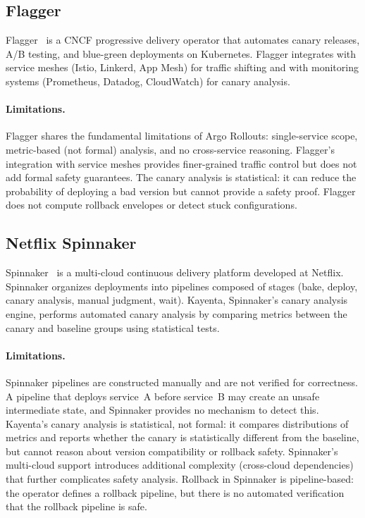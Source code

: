 \documentclass[10pt,twocolumn]{article}
\begin{document}
\subsection{Flagger}

Flagger~\cite{flagger} is a CNCF progressive delivery operator
that automates canary releases, A/B testing, and blue-green
deployments on Kubernetes. Flagger integrates with service meshes
(Istio, Linkerd, App Mesh) for traffic shifting and with
monitoring systems (Prometheus, Datadog, CloudWatch) for canary
analysis.

\paragraph{Limitations.}
Flagger shares the fundamental limitations of Argo Rollouts:
single-service scope, metric-based (not formal) analysis, and
no cross-service reasoning. Flagger's integration with service
meshes provides finer-grained traffic control but does not add
formal safety guarantees. The canary analysis is statistical:
it can reduce the probability of deploying a bad version but
cannot provide a safety proof. Flagger does not compute rollback
envelopes or detect stuck configurations.

\subsection{Netflix Spinnaker}

Spinnaker~\cite{spinnaker} is a multi-cloud continuous delivery
platform developed at Netflix. Spinnaker organizes deployments
into pipelines composed of stages (bake, deploy, canary analysis,
manual judgment, wait). Kayenta, Spinnaker's canary analysis
engine, performs automated canary analysis by comparing metrics
between the canary and baseline groups using statistical tests.

\paragraph{Limitations.}
Spinnaker pipelines are constructed manually and are not verified
for correctness. A pipeline that deploys service~A before
service~B may create an unsafe intermediate state, and Spinnaker
provides no mechanism to detect this. Kayenta's canary analysis
is statistical, not formal: it compares distributions of metrics
and reports whether the canary is statistically different from
the baseline, but cannot reason about version compatibility or
rollback safety. Spinnaker's multi-cloud support introduces
additional complexity (cross-cloud dependencies) that further
complicates safety analysis. Rollback in Spinnaker is
pipeline-based: the operator defines a rollback pipeline, but
there is no automated verification that the rollback pipeline
is safe.
\end{document}
